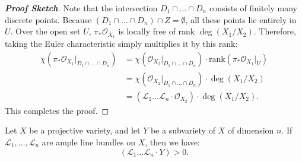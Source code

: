 \begin{proof}[\textbf{Proof Sketch}]
Note that the intersection $D_1 \cap \dots \cap D_n$ consists of finitely many discrete points. Because $(D_1 \cap \dots \cap D_n) \cap Z = \emptyset$, all these points lie entirely in $U$. Over the open set $U$, $\pi_*\mathcal{O}_{X_1}$ is locally free of rank $\deg(X_1/X_2)$. Therefore, taking the Euler characteristic simply multiplies it by this rank:
\begin{align*}
\chi(\pi_*\mathcal{O}_{X_1}|_{D_1 \cap \dots \cap D_n}) &= \chi(\mathcal{O}_{X_2}|_{D_1 \cap \dots \cap D_n}) \cdot \text{rank}(\pi_*\mathcal{O}_{X_1}|_U) \\
&= \chi(\mathcal{O}_{X_2}|_{D_1 \cap \dots \cap D_n}) \cdot \deg(X_1/X_2) \\
&= (\mathcal{L}_1 \dots \mathcal{L}_n \cdot \mathcal{O}_{X_2}) \cdot \deg(X_1/X_2).
\end{align*}
This completes the proof.
\end{proof}

\begin{proposition}[20.1.K]
Let $X$ be a projective variety, and let $Y$ be a subvariety of $X$ of dimension $n$. If $\mathcal{L}_1, \dots, \mathcal{L}_n$ are ample line bundles on $X$, then we have:
\[
(\mathcal{L}_1 \dots \mathcal{L}_n \cdot Y) > 0.
\]
\end{proposition}

